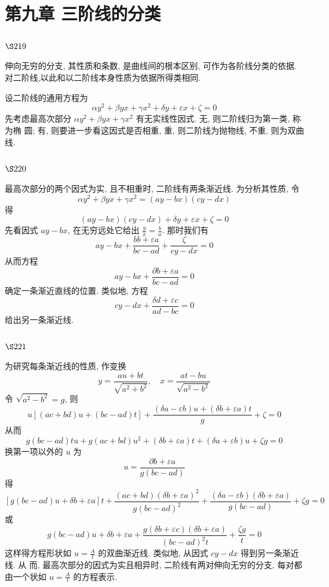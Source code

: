 \chapter{第九章 三阶线的分类}

\section{$\S 219$}

伸向无穷的分支, 其性质和条数, 是曲线间的根本区别, 可作为各阶线分类的依据. 对二阶线,以此和以二阶线本身性质为依据所得类相同.

设二阶线的通用方程为
\[
\alpha y^{2}+\beta y x+\gamma x^{2}+\delta y+\varepsilon x+\zeta=0
\]
先考虑最高次部分 $\alpha y^{2}+\beta y x+\gamma x^{2}$ 有无实线性因式. 无, 则二阶线归为第一类, 称为椭 圆; 有, 则要进一步看这因式是否相重, 重, 则二阶线为抛物线, 不重, 则为双曲线.

\section{$\S 220$}

最高次部分的两个因式为实, 且不相重时, 二阶线有两条渐近线. 为分析其性质, 令
\[
\alpha y^{2}+\beta y x+\gamma x^{2}=(a y-b x)(c y-d x)
\]
得
\[
(a y-b x)(c y-d x)+\delta y+\varepsilon x+\zeta=0
\]
先看因式 $a y-b x$, 在无穷远处它给出 $\frac{y}{x}=\frac{b}{a}$. 那时我们有
\[
a y-b x+\frac{b b+\varepsilon a}{b c-a d}+\frac{\zeta}{c y-d x}=0
\]
从而方程
\[
a y-b x+\frac{\partial b+\varepsilon a}{b c-a d}=0
\]
确定一条渐近直线的位置. 类似地, 方程
\[
c y-d x+\frac{\delta d+\varepsilon c}{a d-b c}=0
\]
给出另一条渐近线.

\section{$\S 221$}

为研究每条渐近线的性质, 作变换
\[
y=\frac{a u+b t}{\sqrt{a^{2}+b^{2}}}, \quad x=\frac{a t-b u}{\sqrt{a^{2}-b^{2}}}
\]
令 $\sqrt{a^{2}-b^{2}}=g$, 则
\[
u[(a c+b d) u+(b c-a d) t]+\frac{(\delta a-\varepsilon b) u+(\delta b+\varepsilon a) t}{g}+\zeta=0
\]
从而
\[
g(b c-a d) t u+g(a c+b d) u^{2}+(\delta b+\varepsilon a) t+(\delta a+\varepsilon b) u+\zeta g=0
\]
换第一项以外的 $u$ 为
\[
u=\frac{\partial b+\varepsilon a}{g(b c-a d)}
\]
得
\[
[g(b c-a d) u+\delta b+\varepsilon a] t+\frac{(a c+b d)(\delta b+\varepsilon a)^{2}}{g(b c-a d)^{2}}+\frac{(\delta a-\varepsilon b)(\delta b+\varepsilon a)}{g(b c-a d)}+\zeta g=0
\]
或
\[
g(b c-a d) u+\delta b+\varepsilon a+\frac{g(\delta b+\varepsilon c)(\delta b+\varepsilon a)}{(b c-a d)^{2} t}+\frac{\zeta g}{t}=0
\]
这样得方程形状如 $u=\frac{A}{t}$ 的双曲渐近线. 类似地, 从因式 $c y-d x$ 得到另一条渐近线. 从 而, 最高次部分的因式为实且相异时, 二阶线有两对伸向无穷的分支, 每对都由一个状如 $u=\frac{A}{t}$ 的方程表示.

